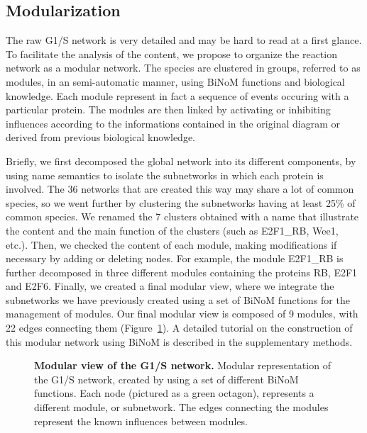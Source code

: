 \documentclass[10pt]{bmc_article}
\newenvironment{bmcformat}{\baselineskip20pt\sloppy\setboolean{publ}{false}}{\baselineskip20pt\sloppy}
\begin{document}
\begin{bmcformat}
\subsection*{Modularization} 

The raw G1/S network is very detailed and may be hard to read at a first glance.
To facilitate the analysis of the content, we propose to organize the reaction
network as a modular network. The species are clustered in groups, referred to
as modules, in an semi-automatic manner, using BiNoM functions and biological
knowledge. Each module represent in fact a
sequence of events occuring with a particular protein. The modules are then
linked by activating or inhibiting influences according to the informations
contained in the original diagram or derived from previous biological knowledge.

Briefly, we first decomposed the global network into its different components,
by using name semantics to isolate the subnetworks in which
each protein is involved. The 36 networks that are created this way may share a
lot of common species, so we went further
by clustering the subnetworks having at least 25\% of common species. We renamed
the 7 clusters obtained with a name that illustrate the content and the main
function of the clusters (such as E2F1\_RB, Wee1, etc.). Then, we checked the
content of each module, making modifications if necessary by adding or deleting nodes. 
For example, the module E2F1\_RB is
further decomposed in three different modules containing the proteins RB, E2F1
and E2F6. Finally, we created a final modular view, where we integrate the
subnetworks we have previously created using a set of BiNoM functions for the
management of modules. Our final modular view is composed of 9 modules, with 22
edges connecting them (Figure~\ref{g1smodular}). A detailed tutorial on the
construction of
this modular network using BiNoM is described in the supplementary methods.


\begin{figure}[h]
 \caption{\label{g1smodular}  \textbf{Modular view of the G1/S network.}
	Modular representation of the G1/S network, created by using a set of
different BiNoM functions. Each node (pictured as a green octagon), represents a
different module, or subnetwork. The edges connecting the modules represent the
 known influences between modules. }
\end{figure}


\end{bmcformat}
\end{document}
